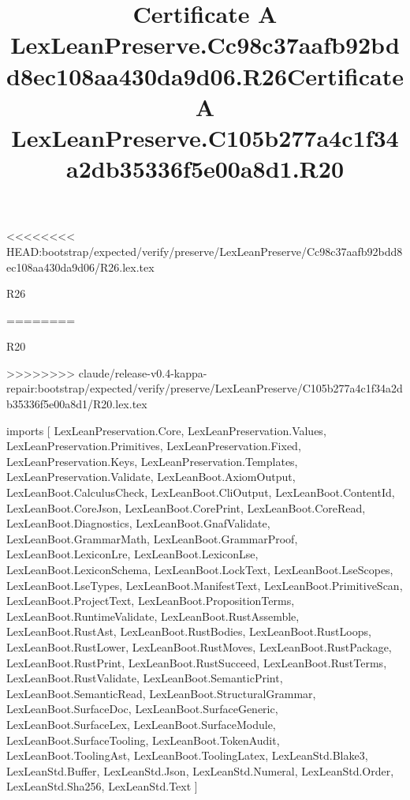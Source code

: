 <<<<<<<< HEAD:bootstrap/expected/verify/preserve/LexLeanPreserve/Cc98c37aafb92bdd8ec108aa430da9d06/R26.lex.tex
\begin{lexlean}{R26}
\title{Certificate A LexLeanPreserve.Cc98c37aafb92bdd8ec108aa430da9d06.R26}
========
\begin{lexlean}{R20}
\title{Certificate A LexLeanPreserve.C105b277a4c1f34a2db35336f5e00a8d1.R20}
>>>>>>>> claude/release-v0.4-kappa-repair:bootstrap/expected/verify/preserve/LexLeanPreserve/C105b277a4c1f34a2db35336f5e00a8d1/R20.lex.tex
\begin{coremodule}
imports [
  LexLeanPreservation.Core,
  LexLeanPreservation.Values,
  LexLeanPreservation.Primitives,
  LexLeanPreservation.Fixed,
  LexLeanPreservation.Keys,
  LexLeanPreservation.Templates,
  LexLeanPreservation.Validate,
  LexLeanBoot.AxiomOutput,
  LexLeanBoot.CalculusCheck,
  LexLeanBoot.CliOutput,
  LexLeanBoot.ContentId,
  LexLeanBoot.CoreJson,
  LexLeanBoot.CorePrint,
  LexLeanBoot.CoreRead,
  LexLeanBoot.Diagnostics,
  LexLeanBoot.GnafValidate,
  LexLeanBoot.GrammarMath,
  LexLeanBoot.GrammarProof,
  LexLeanBoot.LexiconLre,
  LexLeanBoot.LexiconLse,
  LexLeanBoot.LexiconSchema,
  LexLeanBoot.LockText,
  LexLeanBoot.LseScopes,
  LexLeanBoot.LseTypes,
  LexLeanBoot.ManifestText,
  LexLeanBoot.PrimitiveScan,
  LexLeanBoot.ProjectText,
  LexLeanBoot.PropositionTerms,
  LexLeanBoot.RuntimeValidate,
  LexLeanBoot.RustAssemble,
  LexLeanBoot.RustAst,
  LexLeanBoot.RustBodies,
  LexLeanBoot.RustLoops,
  LexLeanBoot.RustLower,
  LexLeanBoot.RustMoves,
  LexLeanBoot.RustPackage,
  LexLeanBoot.RustPrint,
  LexLeanBoot.RustSucceed,
  LexLeanBoot.RustTerms,
  LexLeanBoot.RustValidate,
  LexLeanBoot.SemanticPrint,
  LexLeanBoot.SemanticRead,
  LexLeanBoot.StructuralGrammar,
  LexLeanBoot.SurfaceDoc,
  LexLeanBoot.SurfaceGeneric,
  LexLeanBoot.SurfaceLex,
  LexLeanBoot.SurfaceModule,
  LexLeanBoot.SurfaceTooling,
  LexLeanBoot.TokenAudit,
  LexLeanBoot.ToolingAst,
  LexLeanBoot.ToolingLatex,
  LexLeanStd.Blake3,
  LexLeanStd.Buffer,
  LexLeanStd.Json,
  LexLeanStd.Numeral,
  LexLeanStd.Order,
  LexLeanStd.Sha256,
  LexLeanStd.Text
]


\end{coremodule}
\end{lexlean}
\end{lexlean}
